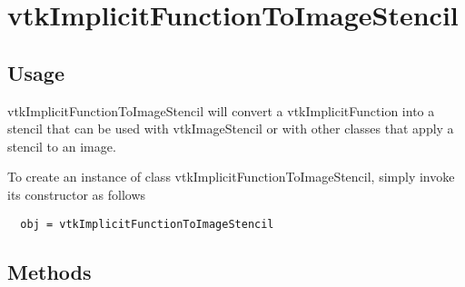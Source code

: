 \section{vtkImplicitFunctionToImageStencil}

\subsection{Usage}

 vtkImplicitFunctionToImageStencil will convert a vtkImplicitFunction into
 a stencil that can be used with vtkImageStencil or with other classes
 that apply a stencil to an image.

To create an instance of class vtkImplicitFunctionToImageStencil, simply
invoke its constructor as follows
\begin{verbatim}
  obj = vtkImplicitFunctionToImageStencil
\end{verbatim}
\subsection{Methods}

